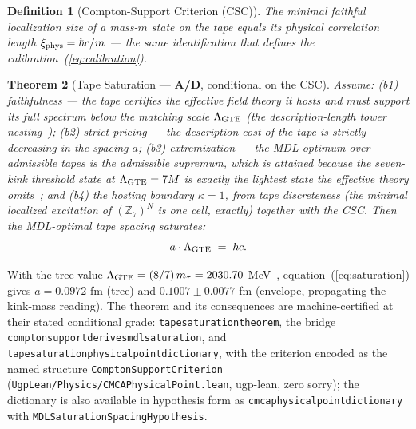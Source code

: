 \documentclass[11pt]{article}
\newtheorem{theorem}{Theorem}[section]
\newtheorem{definition}[theorem]{Definition}
\theoremstyle{remark}
\newcommand{\lean}[1]{%
  \penalty-100
  \begingroup\def\_{\textunderscore\allowbreak}\texttt{#1}\endgroup}
\newcommand{\CatAD}{\textbf{A/D}}
\begin{document}
\begin{definition}[Compton-Support Criterion (CSC)]
\label{def:csc}
The minimal faithful localization size of a mass-$m$ state on the tape equals
its physical correlation length $\xi_{\rm phys} = \hbar c/m$ --- the same
identification that defines the calibration~(\ref{eq:calibration}).
\end{definition}

\begin{theorem}[Tape Saturation --- \CatAD{}, conditional on the CSC]
\label{thm:saturation}
Assume: (b1) \emph{faithfulness} --- the tape certifies the effective field
theory it hosts and must support its full spectrum below the matching scale
$\Lambda_{\rm GTE}$ (the description-length tower
nesting~\cite{SpivackPolynomialTransputation}); (b2) \emph{strict pricing} ---
the description cost of the tape is strictly decreasing in the spacing $a$;
(b3) \emph{extremization} --- the MDL optimum over admissible tapes is the
admissible supremum, which is attained because the seven-kink threshold state
at $\Lambda_{\rm GTE} = 7M$ is exactly the lightest state the effective theory
omits~\cite{SpivackGTEQCDStructure}; and (b4) the \emph{hosting boundary}
$\kappa = 1$, from tape discreteness (the minimal localized excitation of
$(\mathbb{Z}_7)^N$ is one cell, exactly) together with the CSC. Then the
MDL-optimal tape spacing saturates:
\begin{equation}\label{eq:saturation}
  a \cdot \Lambda_{\rm GTE} \;=\; \hbar c .
\end{equation}
\end{theorem}

With the tree value $\Lambda_{\rm GTE} = (8/7)\,m_\tau = 2030.70$
MeV~\cite{SpivackGTEQCDStructure}, equation~(\ref{eq:saturation}) gives
$a = 0.0972$ fm (tree) and $0.1007 \pm 0.0077$ fm (envelope, propagating the
kink-mass reading). The theorem and its consequences are machine-certified at
their stated conditional grade: \lean{tape\_saturation\_theorem}, the bridge
\lean{compton\_support\_derives\_mdl\_saturation}, and
\lean{tape\_saturation\_physical\_point\_dictionary}, with the criterion
encoded as the named structure \lean{ComptonSupportCriterion}
(\texttt{UgpLean/Physics/CMCAPhysicalPoint.lean}, ugp-lean, zero sorry); the
dictionary is also available in hypothesis form as
\lean{cmca\_physical\_point\_dictionary} with
\lean{MDLSaturationSpacingHypothesis}.
\end{document}
